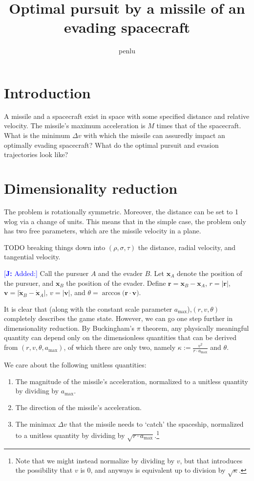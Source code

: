 \documentclass{article}
\newcommand{\authnote}[3]{\textcolor{#3}{[{\footnotesize {\bf #1:} { {#2}}}]}}
\newcommand{\jnote}[1]{\authnote{J}{#1}{blue} }
\begin{document}
\title{Optimal pursuit by a missile of an evading spacecraft}
\author{penlu}

\maketitle

\section{Introduction}

A missile and a spacecraft exist in space with some specified distance and
relative velocity.  The missile's maximum acceleration is $M$ times that of the
spacecraft.  What is the minimum $\Delta v$ with which the missile can assuredly
impact an optimally evading spacecraft?  What do the optimal pursuit and evasion
trajectories look like?

\section{Dimensionality reduction}

The problem is rotationally symmetric. Moreover, the distance can be set to 1
wlog via a change of units. This means that in the simple case, the problem only
has two free parameters, which are the missile velocity in a plane.

TODO breaking things down into $(\rho, \sigma, \tau)$ the distance, radial
velocity, and tangential velocity.

\jnote{Added:}
\renewcommand{\vec}{\mathbf}
Call the pursuer $A$ and the evader $B$.  Let $\vec{x}_A$
  denote the position of the
  pursuer, and $\vec{x}_B$ the position of the evader.  Define $\vec{r} = \vec{x}_B
  - \vec{x}_A$, $r = | \vec{r} |$, $\vec{v} = \big | \dot{\vec{x}}_B -
  \dot{\vec{x}}_A \big |$, $v = | \vec{v} |$, and $\theta = \arccos \big ( \vec{r}
  \cdot \vec{v} \big )$.

  It is clear that (along with the constant scale parameter
  $a_{\max}$),$(r, v, \theta)$ completely describes the game state.  However, we
  can go one step further in dimensionality reduction.  By Buckingham's $\pi$
  theorem, any physically meaningful quantity can depend only on the
  dimensionless quantities that can be derived from $(r, v, \theta, a_{\max})$,
  of which there are only two, namely $\kappa := \frac{v^2}{r \cdot a_{\max}}$
  and $\theta$.

  We care about the following unitless quantities:
  \begin{enumerate}
  \item The magnitude of the missile's acceleration, normalized to a unitless
    quantity by dividing by $a_{\max}$.
  \item The direction of the missile's acceleration.
  \item The minimax $\Delta v$ that the missile needs to `catch' the spaceship,
    normalized to a unitless quantity by dividing by $\sqrt{r \cdot a_{\max}}$.\footnote{Note that we
      might instead normalize by dividing by $v$, but that introduces the
      possibility that $v$ is $0$, and anyways is equivalent up to division by $\sqrt{\kappa}$.}
  \end{enumerate}
\end{document}
